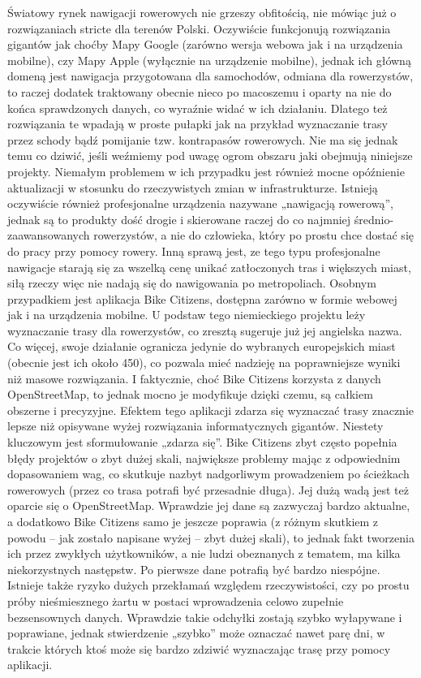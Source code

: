 Światowy rynek nawigacji rowerowych nie grzeszy obfitością, nie mówiąc już o rozwiązaniach stricte dla terenów Polski. Oczywiście funkcjonują rozwiązania gigantów jak choćby Mapy Google (zarówno wersja webowa jak i na urządzenia mobilne), czy Mapy Apple (wyłącznie na urządzenie mobilne), jednak ich główną domeną jest nawigacja przygotowana dla samochodów, odmiana dla rowerzystów, to raczej dodatek traktowany obecnie nieco po macoszemu i oparty na nie do końca sprawdzonych danych, co wyraźnie widać w ich działaniu. Dlatego też rozwiązania te wpadają w proste pułapki jak na przykład wyznaczanie trasy przez schody bądź pomijanie tzw. kontrapasów rowerowych. Nie ma się jednak temu co dziwić, jeśli weźmiemy pod uwagę ogrom obszaru jaki obejmują niniejsze projekty. Niemałym problemem w ich przypadku jest również mocne opóźnienie aktualizacji w stosunku do rzeczywistych zmian w infrastrukturze. Istnieją oczywiście również profesjonalne urządzenia nazywane „nawigacją rowerową”, jednak są to produkty dość drogie i skierowane raczej do co najmniej średnio-zaawansowanych rowerzystów, a nie do człowieka, który po prostu chce dostać się do pracy przy pomocy rowery. Inną sprawą jest, ze tego typu profesjonalne nawigacje starają się za wszelką cenę unikać zatłoczonych tras i większych miast, siłą rzeczy więc nie nadają się do nawigowania po metropoliach. \newline
Osobnym przypadkiem jest aplikacja Bike Citizens, dostępna zarówno w formie webowej jak i na urządzenia mobilne. U podstaw tego niemieckiego projektu leży wyznaczanie trasy dla rowerzystów, co zresztą sugeruje już jej angielska nazwa. Co więcej, swoje działanie ogranicza jedynie do wybranych europejskich miast (obecnie jest ich około 450), co pozwala mieć nadzieję na poprawniejsze wyniki niż masowe rozwiązania. I faktycznie, choć Bike Citizens korzysta z danych OpenStreetMap, to jednak mocno je modyfikuje dzięki czemu, są całkiem obszerne i precyzyjne. Efektem tego aplikacji zdarza się wyznaczać trasy znacznie lepsze niż opisywane wyżej rozwiązania informatycznych gigantów. Niestety kluczowym jest sformułowanie „zdarza się”. Bike Citizens zbyt często popełnia błędy projektów o zbyt dużej skali, największe problemy mając z odpowiednim dopasowaniem wag, co skutkuje nazbyt nadgorliwym prowadzeniem po ścieżkach rowerowych (przez co trasa potrafi być przesadnie długa). Jej dużą wadą jest też oparcie się o OpenStreetMap. Wprawdzie jej dane są zazwyczaj bardzo aktualne, a dodatkowo Bike Citizens samo je jeszcze poprawia (z różnym skutkiem z powodu – jak zostało napisane wyżej – zbyt dużej skali), to jednak fakt tworzenia ich przez zwykłych użytkowników, a nie ludzi obeznanych z tematem, ma kilka niekorzystnych następstw. Po pierwsze dane potrafią być bardzo niespójne. Istnieje także ryzyko dużych przekłamań względem rzeczywistości, czy po prostu próby nieśmiesznego żartu w postaci wprowadzenia celowo zupełnie bezsensownych danych. Wprawdzie takie odchyłki zostają szybko wyłapywane i poprawiane, jednak stwierdzenie „szybko” może oznaczać nawet parę dni, w trakcie których ktoś może się bardzo zdziwić wyznaczając trasę przy pomocy aplikacji.\newline
